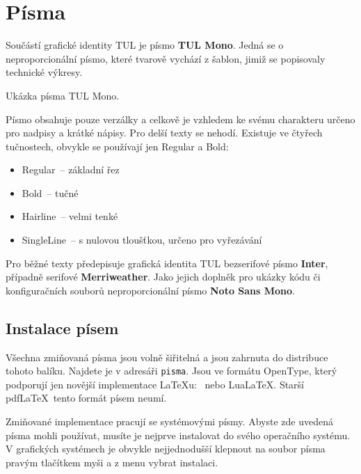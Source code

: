 \documentclass[a4paper,12pt,fonts,numbering]{./tulpackage/tularticle}
\newcommand{\cmdfont}[1]{\texttt{\color{\tulcolor}#1}}
\begin{document}
\section{Písma}\label{pisma}

Součástí grafické identity TUL je písmo \textbf{TUL Mono}. Jedná se o
neproporcionální písmo, které tvarově vychází z šablon, jimiž se
popisovaly technické výkresy.

{\TULFancyFont Ukázka písma TUL Mono.}

Písmo obsahuje pouze verzálky a celkově je vzhledem ke svému charakteru určeno
pro nadpisy a krátké nápisy. Pro delší texty se nehodí. Existuje ve čtyřech
tučnostech, obvykle se používají jen Regular a Bold:

\begin{itemize}\setlength{\itemsep}{0pt}
\item Regular~-- základní řez
\item Bold~-- tučné
\item Hairline~-- velmi tenké
\item SingleLine~-- s nulovou tloušťkou, určeno pro vyřezávání
\end{itemize}


Pro běžné texty předepisuje grafická identita TUL bezserifové písmo
\textbf{Inter}, případně serifové \textbf{Merriweather}. Jako jejich doplněk
pro ukázky kódu či konfiguračních souborů neproporcionální písmo \textbf{Noto
Sans Mono}.

\clearpage

\subsection{Instalace písem}

Všechna zmiňovaná písma jsou volně šiřitelná a jsou zahrnuta do distribuce
tohoto balíku. Najdete je v adresáři \cmdfont{pisma}. Jsou ve formátu OpenType,
který podporují jen novější implementace \LaTeX u: \XeLaTeX\ nebo Lua\LaTeX.
Starší pdf\LaTeX\ tento formát písem neumí.

Zmiňované implementace pracují se systémovými písmy. Abyste zde uvedená písma
mohli používat, musíte je nejprve instalovat do svého operačního systému. V
grafických systémech je obvykle nejjednodušší klepnout na soubor písma pravým
tlačítkem myši a z menu vybrat instalaci.
\end{document}
